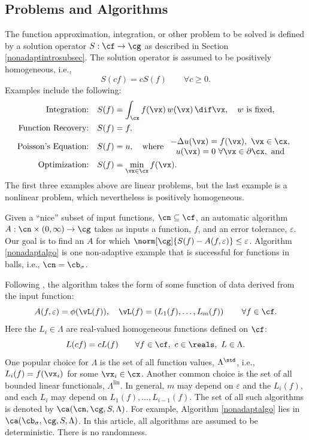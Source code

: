 \documentclass[]{elsarticle}
\DeclareMathOperator{\lin}{lin}
\theoremstyle{definition}
\theoremstyle{remark}
\begin{document}
\subsection{Problems and Algorithms} The function approximation, integration, or other problem to be solved is defined by a solution operator $S:\cf \to \cg$ as described in Section \ref{nonadaptintrosubsec}. The solution operator is assumed to be positively homogeneous, i.e., 
\[
S(cf) = cS(f) \qquad \forall c\ge 0.
\]
Examples include the following:
\begin{align*}
\text{Integration:} \quad & S(f) = \int_{\cx} f(\vx) \, w(\vx) \, \dif \vx, \quad w \text{ is fixed,}\\
\text{Function Recovery:} \quad & S(f) = f, \\
\text{Poisson's Equation:} \quad & S(f) = u, \quad \text{where } \begin{array}{c} -\Delta u(\vx) = f(\vx), \ \vx \in \cx, \\ u(\vx)=0 \ \forall \vx \in \partial \cx, \text{ and}\end{array} \\
\text{Optimization:} \quad & S(f) = \min_{\vx \in \cx} f(\vx).
\end{align*}
The first three examples above are linear problems, but the last example is a nonlinear problem, which nevertheless is positively homogeneous.

Given a ``nice'' subset of input functions, $\cn \subseteq \cf$, an automatic algorithm $A:\cn\times(0,\infty) \to \cg$ takes as inputs a function, $f$, and an error tolerance, $\varepsilon$.  Our goal is to find an $A$ for which $\norm[\cg]{S(f)-A(f,\varepsilon)}\le \varepsilon$.  Algorithm \ref{nonadaptalgo} is one non-adaptive example that is successful for functions in balls, i.e., $\cn=\cb_{\sigma}$.

Following \cite[Section 3.2]{TraWasWoz88}, the algorithm takes the form of some function of data derived from the input function:
\begin{equation*}
\label{algoform}
A(f,\varepsilon) =  \phi(\vL(f)), \quad \vL(f) = \left(L_1(f), \ldots, L_m(f)\right) \qquad \forall f \in \cf.
\end{equation*}
Here the $L_i \in \Lambda$ are real-valued homogeneous functions defined on $\cf$:
\begin{equation*}
\label{dataassump}
L(cf) = cL(f) \qquad \forall f \in \cf, \ c \in \reals, \ L \in \Lambda.
\end{equation*}
One popular choice for $\Lambda$ is the set of all function values, $\Lambda^{\std}$, i.e., $L_i(f) = f(\vx_i)$ for some $\vx_i \in \cx$.  Another common choice is the set of all bounded linear functionals, $\Lambda^{\lin}$.  In general, $m$ may depend on  $\varepsilon$ and the $L_i(f)$, and each $L_i$ may depend on $L_1(f), \ldots, L_{i-1}(f)$.  The set of all such algorithms is denoted by $\ca(\cn,\cg,S,\Lambda)$. For example, Algorithm \ref{nonadaptalgo} lies in $\ca(\cb_{\sigma},\cg,S,\Lambda)$.  In this article, all algorithms are assumed to be deterministic.  There is no randomness.
\end{document}
